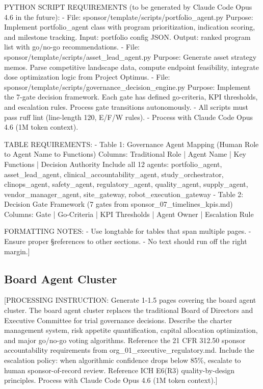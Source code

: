 PYTHON SCRIPT REQUIREMENTS (to be generated by Claude Code Opus 4.6 in the future):
- File: sponsor/template/scripts/portfolio\_agent.py
  Purpose: Implement portfolio\_agent class with program prioritization, indication
  scoring, and milestone tracking. Input: portfolio config JSON. Output: ranked program
  list with go/no-go recommendations.
- File: sponsor/template/scripts/asset\_lead\_agent.py
  Purpose: Generate asset strategy memos. Parse competitive landscape data, compute
  endpoint feasibility, integrate dose optimization logic from Project Optimus.
- File: sponsor/template/scripts/governance\_decision\_engine.py
  Purpose: Implement the 7-gate decision framework. Each gate has defined go-criteria,
  KPI thresholds, and escalation rules. Process gate transitions autonomously.
- All scripts must pass ruff lint (line-length 120, E/F/W rules).
- Process with Claude Code Opus 4.6 (1M token context).

TABLE REQUIREMENTS:
- Table 1: Governance Agent Mapping (Human Role to Agent Name to Functions)
  Columns: Traditional Role | Agent Name | Key Functions | Decision Authority
  Include all 12 agents: portfolio\_agent, asset\_lead\_agent, clinical\_accountability\_agent,
  study\_orchestrator, clinops\_agent, safety\_agent, regulatory\_agent, quality\_agent,
  supply\_agent, vendor\_manager\_agent, site\_gateway, robot\_execution\_gateway
- Table 2: Decision Gate Framework (7 gates from sponsor\_07\_timelines\_kpis.md)
  Columns: Gate | Go-Criteria | KPI Thresholds | Agent Owner | Escalation Rule

FORMATTING NOTES:
- Use longtable for tables that span multiple pages.
- Ensure proper \S references to other sections.
- No text should run off the right margin.]

\subsection{Board Agent Cluster}

[PROCESSING INSTRUCTION: Generate 1-1.5 pages covering the board agent cluster. The board
agent cluster replaces the traditional Board of Directors and Executive Committee for trial
governance decisions. Describe the charter management system, risk appetite quantification,
capital allocation optimization, and major go/no-go voting algorithms. Reference the
21 CFR 312.50 sponsor accountability requirements from org\_01\_executive\_regulatory.md.
Include the escalation policy: when algorithmic confidence drops below 85\%, escalate to
human sponsor-of-record review. Reference ICH E6(R3) quality-by-design principles.
Process with Claude Code Opus 4.6 (1M token context).]

